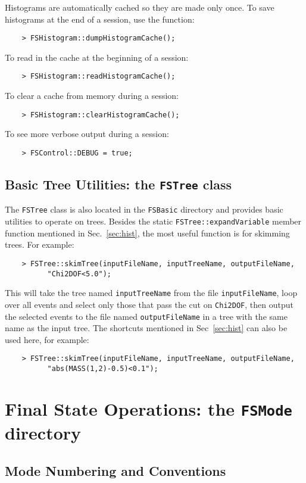 \documentclass[11pt]{article}
\begin{document}
Histograms are automatically cached so they are made only once.  To save histograms at the end of a session, use the function:
\begin{verbatim}
    > FSHistogram::dumpHistogramCache(); 
\end{verbatim}
To read in the cache at the beginning of a session:
\begin{verbatim}
    > FSHistogram::readHistogramCache(); 
\end{verbatim}
To clear a cache from memory during a session:
\begin{verbatim}
    > FSHistogram::clearHistogramCache(); 
\end{verbatim}
To see more verbose output during a session:
\begin{verbatim}
    > FSControl::DEBUG = true;
\end{verbatim}

\subsection{Basic Tree Utilities: the {\tt FSTree} class}
\label{sec:tree}

The {\tt FSTree} class is also located in the {\tt FSBasic} directory and provides basic utilities to operate on trees.  
Besides the static {\tt FSTree::expandVariable} member function mentioned in Sec.~\ref{sec:hist}, the most useful function is for skimming trees.  For example:
\begin{verbatim}
    > FSTree::skimTree(inputFileName, inputTreeName, outputFileName,
          "Chi2DOF<5.0"); 
\end{verbatim}
This will take the tree named {\tt inputTreeName} from the file {\tt inputFileName}, loop over all events and select only those that pass the cut on {\tt Chi2DOF}, then output the selected events to the file named {\tt outputFileName} in a tree with the same name as the input tree.  The shortcuts mentioned in Sec~\ref{sec:hist} can also be used here, for example:
\begin{verbatim}
    > FSTree::skimTree(inputFileName, inputTreeName, outputFileName,
          "abs(MASS(1,2)-0.5)<0.1"); 
\end{verbatim}


\section{Final State Operations:  the {\tt FSMode} directory}
\label{sec:modes}

\subsection{Mode Numbering and Conventions}
\label{sec:modeconv}
\end{document}
